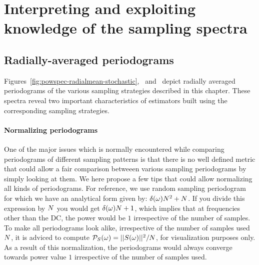 \documentclass[11pt,fleqn]{book} %
\begin{document}
%
%
%



%

%

\section{Interpreting and exploiting knowledge of the sampling spectra}

\subsection{Radially-averaged periodograms}
Figures~\ref{fig:powspec-radialmean-stochastic},~ and~ depict radially averaged periodograms of the various sampling strategies described in this chapter. These spectra reveal two important characteristics of estimators built using the corresponding sampling strategies. 

\paragraph{Normalizing periodograms} 
One of the major issues which is normally encountered while comparing periodograms of different sampling patterns is that there is no well defined metric that could allow a fair comparison betweeen various sampling periodograms by simply looking at them. We here propose a few tips that could allow normalizing all kinds of periodograms. For reference, we use random sampling periodogram for which we have an analytical form given by: $\delta(\omega) N^2 + N$. 
%
%
If you divide this expression by $N$ you would get $\delta(\omega) N + 1$, which implies that at frequencies other than the DC, the power would be $1$ irrespective of the number of samples. 
To make all periodograms look alike, irrespective of the number of samples used $N$, it is adviced to compute $\mathcal{P}_{S}(\mathbf{\omega}) = ||S(\mathbf{\omega})||^2 / N$, for visualization  purposes only. As a result of this normalization, the periodograms would always converge towards power value $1$ irrespective of the number of samples used.
\end{document}
